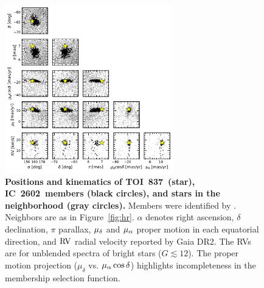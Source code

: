 \documentclass[12pt,twocolumn,tighten]{aastex63}
\newcommand{\tn}{TOI~837} %
\newcommand{\cn}{IC~2602} %
\begin{document}
\begin{figure}[!t]
	\begin{center}
		\leavevmode
		\includegraphics[width=0.65\textwidth]{f8.pdf}
	\end{center}
	\vspace{-0.5cm}
	\caption{ 
  {\bf Positions and kinematics of \tn\ (star), \cn\ members (black
  circles), and stars in the neighborhood (gray circles).} Members
  were identified by \citet{cantatgaudin_gaia_2018}.  Neighbors are as
  in Figure~\ref{fig:hr}. $\alpha$ denotes right ascension, $\delta$
  declination, $\pi$ parallax, $\mu_{\rm \delta}$ and $\mu_{\rm
  \alpha}$ proper motion in each equatorial direction, and ${\rm RV}$
  radial velocity reported by Gaia DR2.  The RVs are for unblended
  spectra of bright stars ($G\lesssim 12$).  The proper motion
  projection ($\mu_{\delta}$ vs{.} $\mu_{\rm \alpha}\cos\delta$)
  highlights incompleteness in the membership selection function.
  \label{fig:full_kinematics}
	}
\end{figure}
\end{document}
